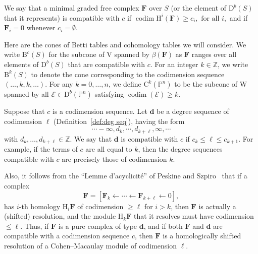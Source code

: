 \documentclass[12pt]{amsart}
\theoremstyle{definition}
\theoremstyle{remark}
\newtheorem{defn}[lemma]{Definition}
\newcommand{\codim}{\operatorname{codim}}
\newcommand{\PP}{\mathbb{P}}
\newcommand{\HH}{\mathrm{H}}
\newcommand{\ZZ}{\mathbb{Z}}
\newcommand{\VV}{\mathrm{V}}
\newcommand{\WW}{\mathrm{W}}
\newcommand{\cc}{c}
\newcommand{\dd}{\mathbf{d}}
\newcommand{\cE}{\mathcal{E}}
\newcommand{\FF}{\mathbf{F}}
\newcommand{\defi}[1]{\textsf{#1}} %
\newcommand{\nothing}{\emptyset}
\newcommand{\DD}{\mathrm{D}}
\newcommand{\CQ}{\mathrm{C}}
\newcommand{\BBQ}{\mathrm{B}}
\newcommand{\daniel}[1]{{\color{green} \sf $\clubsuit\clubsuit\clubsuit$ Daniel: [#1]}}
\begin{document}
We say that a
minimal graded free complex $\FF$ over $S$ (or the element of $\DD^{b}(S)$ that it represents) is \defi{compatible with $\cc$} if 
$
\codim \HH^i(\FF) \geq c_i, \text{ for all } i,
$
and if $\FF_i=0$ whenever $c_i=\nothing$.


Here are the cones of Betti tables and cohomology tables we will consider.
We write $\BBQ^{\cc}(S)$ for the subcone of $\VV$ spanned by $\beta(\FF)$ as $\FF$ ranges over all elements of $\DD^b(S)$ that are compatible with $\cc$.  For an integer $k\in \ZZ$, we write $\BBQ^k(S)$ to denote the cone corresponding to the codimension sequence $(\dots, k,k,\dots)$.
For any $k=0, \dots, n$, we define $\CQ^k(\PP^n)$ to be the subcone of $\WW$ spanned by all $\cE\in \DD^b(\PP^n)$ satisfying $\codim(\cE)\geq k$.

Suppose that $\cc$ is a codimension sequence. Let $\dd$ be a degree sequence 
of codimension $\ell$ (Definition~\ref{def:deg seq}), having the form
$$
\cdots -\infty, d_{k}, \cdots, d_{k+\ell}, \infty, \cdots
$$
with $d_{k},\dots, d_{k+\ell}\in \ZZ$.
We say that $\dd$ is \defi{compatible} with $\cc$ if $c_{k}\leq \ell \leq c_{k+1}$. 
For example, if the terms of $\cc$ are all equal to $k$, then the degree sequences
compatible with $\cc$ are precisely those of codimension $k$.

Also, it follows from the ``Lemme d'acyclicit\'e'' of Peskine and Szpiro~\cite{MR0374130}
that if a complex
$$
\FF= [\FF_{k}\leftarrow \cdots \leftarrow \FF_{k+\ell}\leftarrow 0],
$$
has $i$-th homology $\HH_{i}\FF$ of codimension $\geq\ell$ for $i>k$, then $\FF$ is actually a (shifted) resolution, and the module $\HH_{k}\FF$ that it resolves must have codimension $\leq \ell$. 
Thus, if $\FF$ is a pure complex of type $\dd$, and if both $\FF$ and $\dd$ are compatible with a codimension sequence $\cc$, then $\FF$ is a homologically
shifted resolution of a Cohen--Macaulay module of codimension $\ell$.
\end{document}
